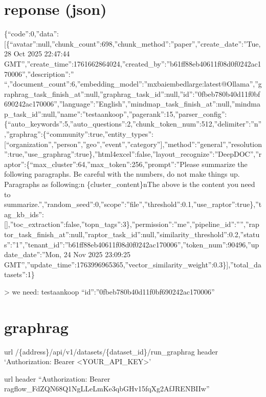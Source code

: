 \documentclass[letterpaper,10pt,english]{sphinxmanual}
\begin{document}
\section{reponse (json)}
\label{\detokenize{graphrag:reponse-json}}
\sphinxAtStartPar
\{“code”:0,”data”:{[}\{“avatar”:null,”chunk\_count”:698,”chunk\_method”:”paper”,”create\_date”:”Tue, 28 Oct 2025 22:47:44 GMT”,”create\_time”:1761662864024,”created\_by”:”b61ff88eb40611f08d0f0242ac170006”,”description”:”  “,”document\_count”:6,”embedding\_model”:”mxbai\sphinxhyphen{}embed\sphinxhyphen{}large:latest@Ollama”,”graphrag\_task\_finish\_at”:null,”graphrag\_task\_id”:null,”id”:”0fbeb780b40d11f0bf690242ac170006”,”language”:”English”,”mindmap\_task\_finish\_at”:null,”mindmap\_task\_id”:null,”name”:”testaankoop”,”pagerank”:15,”parser\_config”:\{“auto\_keywords”:5,”auto\_questions”:2,”chunk\_token\_num”:512,”delimiter”:”n”,”graphrag”:\{“community”:true,”entity\_types”:{[}“organization”,”person”,”geo”,”event”,”category”{]},”method”:”general”,”resolution”:true,”use\_graphrag”:true\},”html4excel”:false,”layout\_recognize”:”DeepDOC”,”raptor”:\{“max\_cluster”:64,”max\_token”:256,”prompt”:”Please summarize the following paragraphs. Be careful with the numbers, do not make things up. Paragraphs as following:n      \{cluster\_content\}nThe above is the content you need to summarize.”,”random\_seed”:0,”scope”:”file”,”threshold”:0.1,”use\_raptor”:true\},”tag\_kb\_ids”:{[}{]},”toc\_extraction”:false,”topn\_tags”:3\},”permission”:”me”,”pipeline\_id”:””,”raptor\_task\_finish\_at”:null,”raptor\_task\_id”:null,”similarity\_threshold”:0.2,”status”:”1”,”tenant\_id”:”b61ff88eb40611f08d0f0242ac170006”,”token\_num”:90496,”update\_date”:”Mon, 24 Nov 2025 23:09:25 GMT”,”update\_time”:1763996965365,”vector\_similarity\_weight”:0.3\}{]},”total\_datasets”:1\}

\sphinxAtStartPar
\textendash{}\textgreater{} we need: testaankoop
“id”:”0fbeb780b40d11f0bf690242ac170006”


\section{graphrag}
\label{\detokenize{graphrag:id1}}\begin{description}
\sphinxAtStartPar
\textendash{}url /\{address\}/api/v1/datasets/\{dataset\_id\}/run\_graphrag \textendash{}header ‘Authorization: Bearer \textless{}YOUR\_API\_KEY\textgreater{}’

\sphinxAtStartPar
\textendash{}url  \textendash{}header “Authorization: Bearer ragflow\sphinxhyphen{}\_FdZQN68Q1NgLLeLmKe\sphinxhyphen{}3qbGHv15fqXg2AfJRENBIIw”

\end{description}
\end{document}
